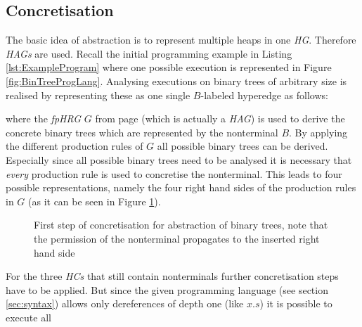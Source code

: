 \subsection{Concretisation}
	The basic idea of abstraction is to represent multiple heaps in one
	\emph{\ac{HG}}. Therefore \emph{\acp{HAG}} are used. Recall the
	initial programming example in Listing \ref{lst:ExampleProgram} where one
	possible execution is represented in Figure \ref{fig:BinTreeProgLang}.
	Analysing executions on binary trees of arbitrary size is realised by
	representing these as one single $B$-labeled hyperedge as follows:
	\begin{center}
		
		\label{tikz:abstractedbintree}
	\end{center}
	where the \emph{\ac{fpHRG}} $G$ from page \pageref{eq:G} (which is actually
	a \emph{\ac{HAG}}) is used to derive the concrete binary trees which are
	represented by the nonterminal $B$. By applying the different production
	rules of $G$ all possible binary trees can be derived. Especially since all
	possible binary trees need to be analysed it is necessary that \emph{every}
	production rule is used to concretise the nonterminal. This leads to four
	possible representations, namely the four right hand sides of the production
	rules in $G$ (as it can be seen in Figure \ref{fig:bintreeconc}).
	\begin{figure}
		\begin{center}
		\end{center}
		\caption{First step of concretisation for abstraction of binary trees,
			note that the permission of the nonterminal propagates to the inserted
		right hand side}
		\label{fig:bintreeconc}
	\end{figure}
	For the three \emph{\acp{HC}} that still contain nonterminals
	further concretisation steps have to be applied. But since the given
	programming language (see section \ref{sec:syntax}) allows only
	dereferences of depth one (like $x.s$) it is possible to execute all
